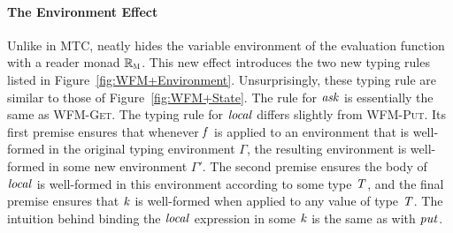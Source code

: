 \paragraph{The Environment Effect} Unlike in MTC, \name neatly hides
the variable environment of the evaluation function with a reader
monad \ensuremath{\mathbb{R}_{\scalebox{0.6}{M}}}. This new effect introduces the two new typing
rules listed in Figure~\ref{fig:WFM+Environment}.  Unsurprisingly,
these typing rule are similar to those of
Figure~\ref{fig:WFM+State}. The rule for \ensuremath{\Varid{ask}} is essentially the same
as \textsc{WFM-Get}. The typing rule for \ensuremath{\Varid{local}} differs slightly from
\textsc{WFM-Put}. Its first premise ensures that whenever \ensuremath{\Varid{f}} is applied
to an environment that is well-formed in the original typing
environment $\Gamma$, the resulting environment is well-formed in some
new environment $\Gamma'$. The second premise ensures the body of
\ensuremath{\Varid{local}} is well-formed in this environment according to some type \ensuremath{\Conid{T}},
and the final premise ensures that \ensuremath{\Varid{k}} is well-formed when applied to
any value of type \ensuremath{\Conid{T}}. The intuition behind binding the \ensuremath{\Varid{local}}
expression in some \ensuremath{\Varid{k}} is the same as with \ensuremath{\Varid{put}}.


